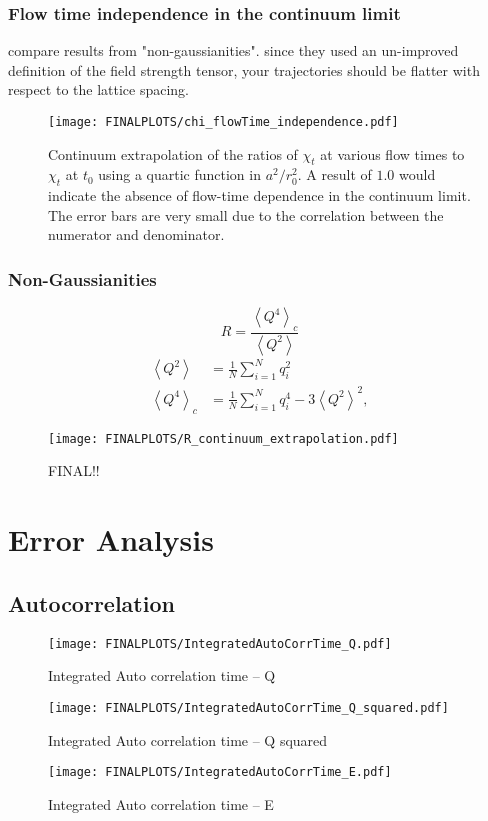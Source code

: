 \documentclass[a4paper,10pt]{article}
\begin{document}
\subsubsection{Flow time independence in the continuum limit}
compare results from "non-gaussianities". since they used an un-improved definition of the field strength tensor, your trajectories should be flatter with respect to the lattice spacing.

\begin{figure}[H]
\centering
\texttt{[image: FINALPLOTS/chi\_flowTime\_independence.pdf]}
\caption[]{Continuum extrapolation of the ratios of $\chi_t$ at various flow times to $\chi_t$ at $t_0$ using a quartic function in $a^2/r_0^2$. A result of $1.0$ would indicate the absence of flow-time dependence in the continuum limit. The error bars are very small due to the correlation between the numerator and denominator.}\label{fig:PLACEHOLDER}
\end{figure}
\subsubsection{Non-Gaussianities}
\begin{equation}
R = \frac{\left\langle Q^4 \right\rangle_c}{\left\langle Q^2 \right\rangle}
\end{equation}
\begin{equation}
\begin{aligned}
\left\langle Q^2 \right\rangle &=\frac{1}{N} \sum_{i=1}^{N} q_{i}^{2} \\
\left\langle Q^4 \right\rangle_c &=\frac{1}{N} \sum_{i=1}^{N} q_{i}^{4}-3\left\langle Q^2 \right\rangle^{2},
\end{aligned}
\end{equation}

\begin{figure}[H]
\centering
\texttt{[image: FINALPLOTS/R\_continuum\_extrapolation.pdf]}
\caption[]{FINAL!!}\label{fig:PLACEHOLDER}
\end{figure}


\section{Error Analysis}
\subsection{Autocorrelation}
\begin{figure}[H]
\centering
\texttt{[image: FINALPLOTS/IntegratedAutoCorrTime\_Q.pdf]}
\caption[]{Integrated Auto correlation time -- Q}\label{fig:PLACEHOLDER}
\end{figure}
\begin{figure}[H]
\centering
\texttt{[image: FINALPLOTS/IntegratedAutoCorrTime\_Q\_squared.pdf]}
\caption[]{Integrated Auto correlation time -- Q squared}\label{fig:PLACEHOLDER}
\end{figure}
\begin{figure}[H]
\centering
\texttt{[image: FINALPLOTS/IntegratedAutoCorrTime\_E.pdf]}
\caption[]{Integrated Auto correlation time -- E}\label{fig:PLACEHOLDER}
\end{figure}
\end{document}
